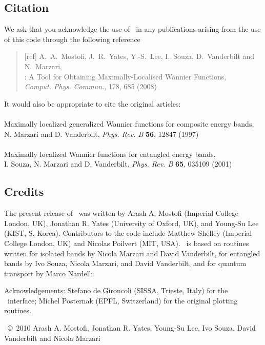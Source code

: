 \subsection{Citation}
We ask that you acknowledge the use of \wannier\ in any publications
arising from the use of this code through the following reference
\begin{quote}
[ref] A.~A.~Mostofi, J.~R.~Yates, Y.-S.~Lee, I.~Souza, D.~Vanderbilt
and N.~Marzari,\\
\wannier: A Tool for Obtaining Maximally-Localised Wannier
  Functions,\\ {\it Comput. Phys. Commun.}, 178, 685 (2008)

\end{quote}                                                              

It would also be appropriate to cite the original articles:\\\\
Maximally localized generalized Wannier functions for composite
  energy bands,\\ 
N. Marzari and D. Vanderbilt, {\it Phys. Rev. B} {\bf 56}, 12847 (1997)\\\\
Maximally localized Wannier functions for entangled energy bands,\\
I. Souza, N. Marzari and D. Vanderbilt, {\it Phys. Rev. B} {\bf 65}, 035109 (2001)


\subsection{Credits}
The present release of \wannier\ was written by Arash A. Mostofi
(Imperial College London, UK), Jonathan R. Yates (University of
Oxford, UK), and Young-Su Lee (KIST, S. Korea). Contributors to the code include
Matthew Shelley (Imperial College London, UK)
and Nicolas Poilvert (MIT, USA). \wannier\ is
based on routines written for isolated bands by Nicola Marzari
and David Vanderbilt, for entangled bands by Ivo Souza, Nicola Marzari,
and David Vanderbilt, and for quantum transport by Marco Nardelli.

Acknowledgements: Stefano de Gironcoli (SISSA, Trieste, Italy) for the
\pwscf\ interface; Michel Posternak (EPFL, Switzerland) for the
original plotting routines. 

\wannier\ \copyright\ 2010 Arash A. Mostofi, Jonathan R. Yates,
Young-Su Lee, Ivo Souza, David Vanderbilt and Nicola Marzari

